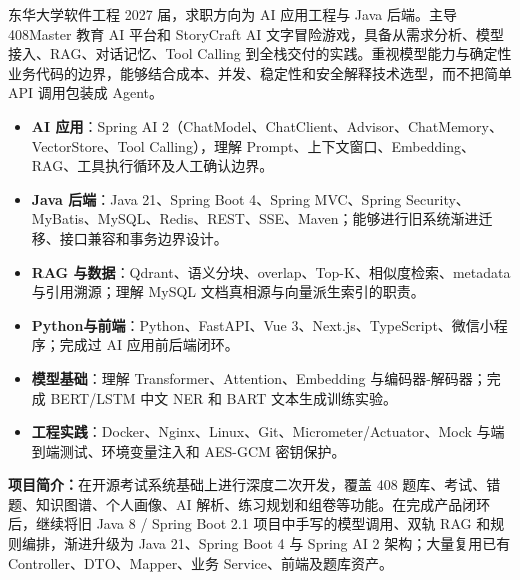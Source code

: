 东华大学软件工程 2027 届，求职方向为 AI 应用工程与 Java 后端。主导 408Master 教育 AI 平台和 StoryCraft AI 文字冒险游戏，具备从需求分析、模型接入、RAG、对话记忆、Tool Calling 到全栈交付的实践。重视模型能力与确定性业务代码的边界，能够结合成本、并发、稳定性和安全解释技术选型，而不把简单 API 调用包装成 Agent。


\begin{itemize}[parsep=0.5ex]
  \item \textbf{AI 应用}：Spring AI 2（ChatModel、ChatClient、Advisor、ChatMemory、VectorStore、Tool Calling），理解 Prompt、上下文窗口、Embedding、RAG、工具执行循环及人工确认边界。
  \item \textbf{Java 后端}：Java 21、Spring Boot 4、Spring MVC、Spring Security、MyBatis、MySQL、Redis、REST、SSE、Maven；能够进行旧系统渐进迁移、接口兼容和事务边界设计。
  \item \textbf{RAG 与数据}：Qdrant、语义分块、overlap、Top-K、相似度检索、metadata 与引用溯源；理解 MySQL 文档真相源与向量派生索引的职责。
  \item \textbf{Python与前端}：Python、FastAPI、Vue 3、Next.js、TypeScript、微信小程序；完成过 AI 应用前后端闭环。
  \item \textbf{模型基础}：理解 Transformer、Attention、Embedding 与编码器-解码器；完成 BERT/LSTM 中文 NER 和 BART 文本生成训练实验。
  \item \textbf{工程实践}：Docker、Nginx、Linux、Git、Micrometer/Actuator、Mock 与端到端测试、环境变量注入和 AES-GCM 密钥保护。
\end{itemize}



\textbf{项目简介：}在开源考试系统基础上进行深度二次开发，覆盖 408 题库、考试、错题、知识图谱、个人画像、AI 解析、练习规划和组卷等功能。在完成产品闭环后，继续将旧 Java 8 / Spring Boot 2.1 项目中手写的模型调用、双轨 RAG 和规则编排，渐进升级为 Java 21、Spring Boot 4 与 Spring AI 2 架构；大量复用已有 Controller、DTO、Mapper、业务 Service、前端及题库资产。

